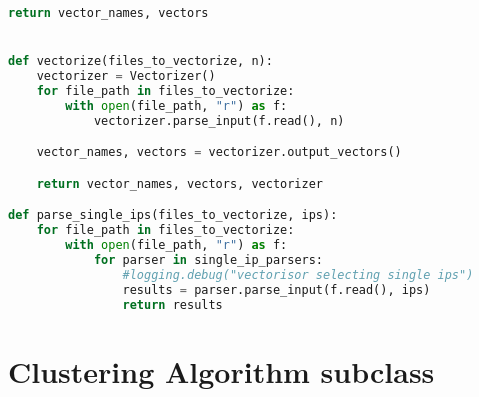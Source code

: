\begin{lstlisting}[language=python]
        return vector_names, vectors


def vectorize(files_to_vectorize, n):
    vectorizer = Vectorizer()
    for file_path in files_to_vectorize:
        with open(file_path, "r") as f:
            vectorizer.parse_input(f.read(), n)

    vector_names, vectors = vectorizer.output_vectors()

    return vector_names, vectors, vectorizer

def parse_single_ips(files_to_vectorize, ips):
    for file_path in files_to_vectorize:
        with open(file_path, "r") as f:
            for parser in single_ip_parsers:
                #logging.debug("vectorisor selecting single ips")
                results = parser.parse_input(f.read(), ips)
                return results
\end{lstlisting}

\section{Clustering Algorithm subclass}
\label{cluster_subclass}
